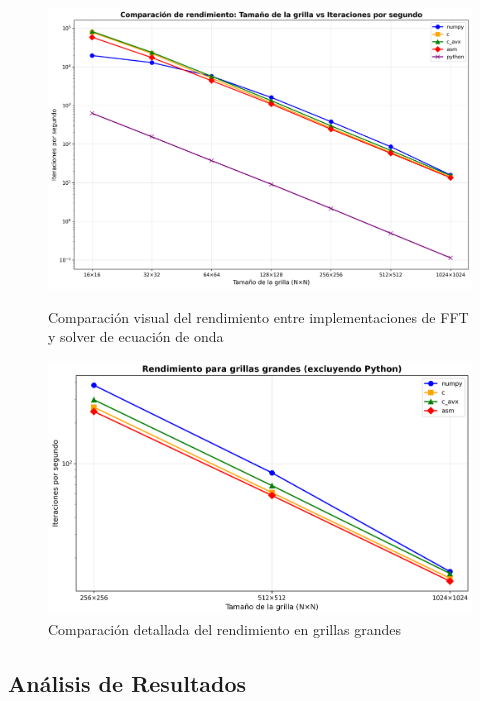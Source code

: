 \documentclass[a4paper]{article}
\begin{document}
\begin{figure}[h]
    \centering
    \begin{minipage}[t]{0.48\textwidth}
        \centering
        \includegraphics[width=\textwidth]{extra/steps_per_second.png}
        \caption{Comparación visual del rendimiento entre implementaciones de FFT y solver de ecuación de onda}
        \label{fig:performance}
    \end{minipage}
    \hfill
    \begin{minipage}[t]{0.48\textwidth}
        \centering
        \includegraphics[width=\textwidth]{extra/steps_per_second_top3.png}
        \caption{Comparación detallada del rendimiento en grillas grandes}
        \label{fig:performance_top3}
    \end{minipage}
\end{figure}

\subsection{Análisis de Resultados}
\end{document}
